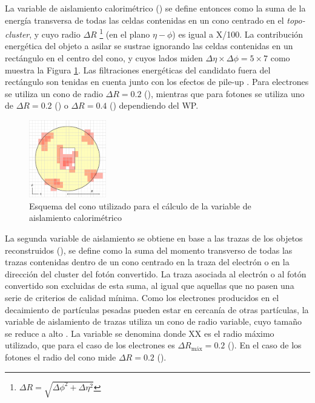 La variable de aislamiento calorimétrico \cite{PERF-2017-01} () se define entonces como la suma de la energía transversa de todas las celdas contenidas en un cono centrado en el \textit{topo-cluster}, y cuyo radio $\Delta R$ \footnote{$\Delta R=\sqrt{\Delta\phi^2+\Delta\eta^2}$} (en el plano $\eta-\phi$) es igual a X/100. La contribución energética del objeto a asilar se sustrae ignorando las celdas contenidas en un rectángulo en el centro del cono, y cuyos lados miden $\Delta\eta\times\Delta\phi = 5 \times 7$ como muestra la Figura \ref{IDcone}. Las filtraciones energéticas del candidato fuera del rectángulo son tenidas en cuenta junto con los efectos de pile-up \cite{Cacciari}. Para electrones se utiliza un cono de radio $\Delta R = 0.2$ (), mientras que para fotones se utiliza uno de $\Delta R = 0.2$ () o $\Delta R = 0.4$ () dependiendo del WP.


\begin{figure}
\centering
  \includegraphics[width=0.3\textwidth]{images/iso.pdf}
\caption{Esquema del cono utilizado para el cálculo de la variable de aislamiento calorimétrico 
\commentNotaIII 
}
  \label{IDcone}
\end{figure}


La segunda variable de aislamiento se obtiene en base a las trazas de los objetos reconstruidos (), se define como la suma del momento transverso de todas las trazas contenidas dentro de un cono centrado en la traza del electrón o en la dirección del cluster del fotón convertido. La traza asociada al electrón o al fotón convertido son excluidas de esta suma, al igual que aquellas que no pasen una serie de criterios de calidad mínima. Como los electrones producidos en el decaimiento de partículas pesadas pueden estar en cercanía de otras partículas, la variable de aislamiento de trazas utiliza un cono de radio variable, cuyo tamaño se reduce a alto \pt. La variable se denomina  donde XX es el radio máximo utilizado, que para el caso de los electrones es $\Delta R_{\text{máx}} = 0.2$ (). En el caso de los fotones el radio del cono mide $\Delta R = 0.2$ ().

